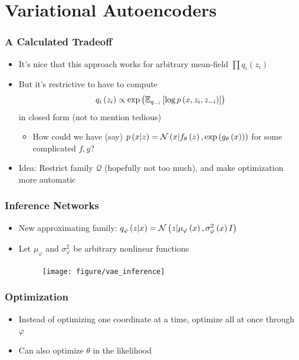 \documentclass[10pt,mathserif]{beamer}
\begin{document}
\section{Variational Autoencoders}

\begin{frame}
  \frametitle{A Calculated Tradeoff}
  \begin{itemize}
  \item It's nice that this approach works for arbitrary mean-field $\prod
    q_{i}\left(z_i\right)$
  \item But it's restrictive to have to compute
    \begin{align*}
      q_i\left(z_i\right) \propto \operatorname{exp}\left(\mathbb{E}_{q_{-i}}\left[{\log p\left(x, z_i, z_{-i}\right)}\right]\right)
    \end{align*}
    in closed form (not to mention tedious)
    \begin{itemize}
    \item How could we have (say) $p\left(x \vert z\right) = \mathcal{N}\left(x \vert
      f_{\theta}\left(z\right), \operatorname{exp}\left(g_{\theta}\left(x\right)\right)\right)$ for some
      complicated $f, g$?
    \end{itemize}
  \item Idea: Restrict family $\mathcal{Q}$ (hopefully not too much), and make
    optimization more automatic
  \end{itemize}
\end{frame}

\begin{frame}
  \frametitle{Inference Networks}
  \begin{itemize}
  \item New approximating family: $q_{\varphi}\left(z \vert x\right) = \mathcal{N}\left(z \vert
    \mu_{\varphi}\left(x\right), \sigma^{2}_{\varphi}\left(x\right) I\right)$
  \item Let $\mu_{\varphi}$ and $\sigma^{2}_{\varphi}$ be arbitrary nonlinear
    functions
    \begin{figure}
        \centering
        \texttt{[image: figure/vae\_inference]}
        \caption{\label{fig:vae_inference} }
    \end{figure}
  \end{itemize}
\end{frame}

\begin{frame}
  \frametitle{Optimization}
\begin{itemize}
\item Instead of optimizing one coordinate at a time, optimize all at once
  through $\varphi$
\item Can also optimize $\theta$ in the likelihood
\end{itemize}
\end{frame}
\end{document}
